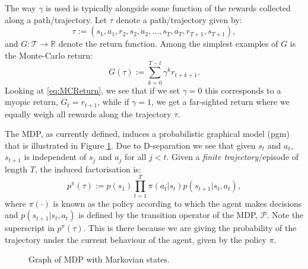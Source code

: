 \documentclass{report}
\newcommand{\reals}{\mbox{\(\mathbb R\)}}
\numberwithin{equation}{section}
\numberwithin{figure}{section}
\numberwithin{table}{section}
\numberwithin{algorithm}{section}
\begin{document}
The way $\gamma$ is used is typically alongside some function of 
the rewards collected along a path/trajectory. Let $\tau$ denote a 
path/trajectory given by:
\begin{equation}
  \tau:=(s_1, a_1, r_2, s_2, a_2, \ldots, s_T, a_T, r_{T+1}, s_{T+1}),\label{eq:tau} 
\end{equation} 
and $G:\mathcal{T}\rightarrow \reals$ denote the return 
function. Among the simplest examples of $G$ is the Monte-Carlo 
return:
\begin{equation}
  G(\tau):=\sum_{k=0}^{T-t}\gamma^kr_{t+k+1}.\label{eq:MCReturn}
\end{equation}
Looking at \eqref{eq:MCReturn}, we see that if we set $\gamma=0$ 
this corresponds to a myopic return, $G_t=r_{t+1}$, while if 
$\gamma=1$, we get a far-sighted return where we equally weigh 
all rewards along the trajectory $\tau$.

The MDP, as currently defined, induces a probabilistic graphical model 
(pgm) that is illustrated in Figure \ref{fig:MDP}. Due to D-separation 
we see that given $s_t$ and  $a_t$, $s_{t+1}$ is independent of 
$s_j$ and $a_j$ for all $j<t$.
Given a \textit{finite trajectory}/episode of length $T$, the induced 
factorisation is:
\begin{equation}
  p^{\pi}(\tau):=p(s_1)\prod_{t=1}^T \pi(a_t|s_t)p(s_{t+1}|s_t,a_t),
\end{equation}
where $\pi(\cdot)$ is known as the policy according to which the 
agent makes decisions and $p(s_{t+1}|s_t, a_t)$ is defined by the 
transition operator of the MDP, $\mathcal{P}$. Note the superscript 
in $p^{\pi}(\tau)$. This is there because we are giving the probability 
of the trajectory under the current behaviour of the agent, given 
by the policy $\pi$.

\begin{figure}[H]
  \centering
  \caption{\label{fig:MDP} Graph of MDP with Markovian states.}
\end{figure}
\end{document}
